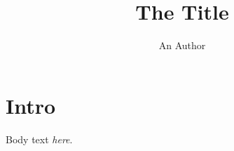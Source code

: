 \documentclass{utexasthesis}
\title{The Title}\author{An Author}
\begin{document}
\maketitle
\chapter{Intro}
Body text \emph{here}.
\end{document}
